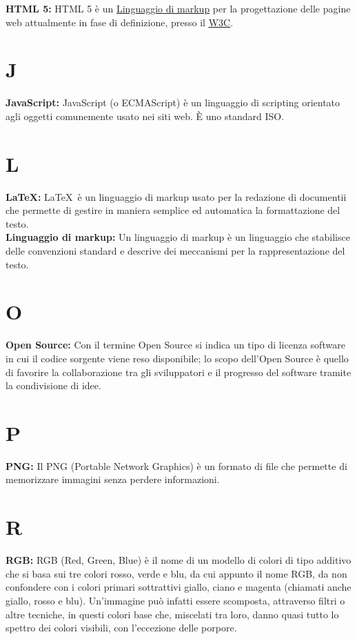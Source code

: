 \hypertarget{html5}{}
\textbf{HTML 5:}
HTML 5 \` e un \hyperlink{linguaggio di markup}{\underline{Linguaggio di markup}} per la progettazione delle pagine web attualmente in fase di definizione, presso il \hyperlink{w3c}{\underline{W3C}}.\\

\section*{J}
\hypertarget{javascript}{}
\textbf{JavaScript:}
JavaScript (o ECMAScript) \`e un linguaggio di scripting orientato agli oggetti comunemente usato nei siti web. \`E  uno standard ISO.\\

\section*{L}
\hypertarget{latex}{}
\textbf{\LaTeX:}
\LaTeX \ \`e un linguaggio di markup usato per la redazione di documentii che permette di gestire in maniera semplice ed automatica la formattazione del testo.\\

\textbf{Linguaggio di markup:}
\hypertarget{markup}{}
Un linguaggio di markup \`e un linguaggio che stabilisce delle convenzioni standard e descrive dei meccanismi per la rappresentazione del testo.\\

\section*{O}
\hypertarget{opensource}{}
\textbf{Open Source:}
Con il termine Open Source si indica un tipo di licenza software in cui il codice sorgente viene reso disponibile; lo scopo dell'Open Source \`e quello di favorire la collaborazione tra gli sviluppatori e il progresso del software tramite la condivisione di idee.\\

\section*{P}
\hypertarget{png}{}
\textbf{PNG:}
Il PNG (Portable Network Graphics) \`e un formato di file che permette di memorizzare immagini senza perdere informazioni.\\

\section*{R}
\hypertarget{rgb}{}
\textbf{RGB:}
RGB (Red, Green, Blue) \`e  il nome di un modello di colori di tipo additivo che si basa sui tre colori rosso, verde e blu, da cui appunto il nome RGB, da non confondere con i colori primari sottrattivi giallo, ciano e magenta (chiamati anche giallo, rosso e blu).
Un'immagine pu\`o  infatti essere scomposta, attraverso filtri o altre tecniche, in questi colori base che, miscelati tra loro, danno quasi tutto lo spettro dei colori visibili, con l'eccezione delle porpore.\\

